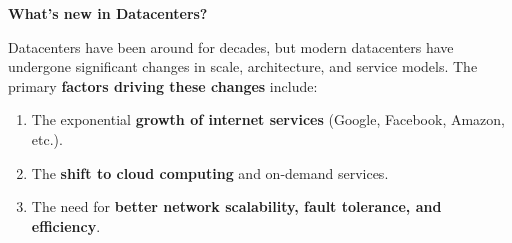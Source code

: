 \highspace
\begin{flushleft}
    \textcolor{Green3}{\faIcon{\speedIcon} \textbf{What's new in Datacenters?}}
\end{flushleft}
Datacenters have been around for decades, but modern datacenters have undergone significant changes in scale, architecture, and service models. The primary \textbf{factors driving these changes} include:
\begin{enumerate}[label=\textcolor{Green3}{\faIcon{check}}]
    \item The exponential \textbf{growth of internet services} (Google, Facebook, Amazon, etc.).
    \item The \textbf{shift to cloud computing} and on-demand services.
    \item The need for \textbf{better network scalability, fault tolerance, and efficiency}.
\end{enumerate}

\newpage

